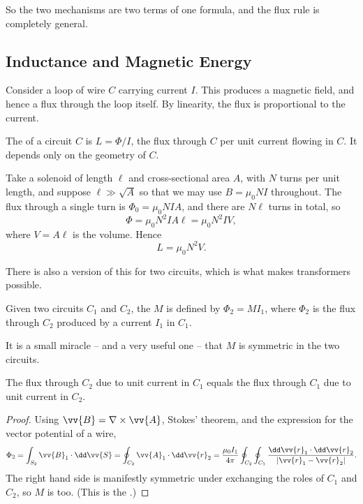 So the two mechanisms are two terms of one formula, and the flux rule is completely general.

\subsection{Inductance and Magnetic Energy}

Consider a loop of wire $C$ carrying current $I$. This produces a magnetic field, and hence a flux through the loop itself. By linearity, the flux is proportional to the current.

\begin{definition}[Inductance]
	The  of a circuit $C$ is $L = \Phi/I$, the flux through $C$ per unit current flowing in $C$. It depends only on the geometry of $C$.
\end{definition}

\begin{example}
	Take a solenoid of length $\ell$ and cross-sectional area $A$, with $N$ turns per unit length, and suppose $\ell \gg \sqrt{A}$ so that we may use $B = \mu_0 N I$ throughout. The flux through a single turn is $\Phi_0 = \mu_0 N I A$, and there are $N\ell$ turns in total, so
	$$
	\Phi = \mu_0 N^2 I A \ell = \mu_0 N^2 I V,
	$$
	where $V = A\ell$ is the volume. Hence
	$$
	L = \mu_0 N^2 V.
	$$
\end{example}

There is also a version of this for two circuits, which is what makes transformers possible.

\begin{definition}
	Given two circuits $C_1$ and $C_2$, the  $M$ is defined by $\Phi_2 = M I_1$, where $\Phi_2$ is the flux through $C_2$ produced by a current $I_1$ in $C_1$.
\end{definition}

It is a small miracle -- and a very useful one -- that $M$ is symmetric in the two circuits.

\begin{proposition}
	The flux through $C_2$ due to unit current in $C_1$ equals the flux through $C_1$ due to unit current in $C_2$.
\end{proposition}
\begin{proof}
	Using $\vv{B} = \nabla\times\vv{A}$, Stokes' theorem, and the expression for the vector potential of a wire,
	$$
	\Phi_2 = \int_{S_2}\vv{B}_1\cdot\dd\vv{S} = \oint_{C_2}\vv{A}_1\cdot \dd\vv{r}_2 = \frac{\mu_0 I_1}{4\pi}\oint_{C_2}\oint_{C_1}\frac{\dd \vv{r}_1\cdot \dd\vv{r}_2}{|\vv{r}_1-\vv{r}_2|}.
	$$
	The right hand side is manifestly symmetric under exchanging the roles of $C_1$ and $C_2$, so $M$ is too. (This is the .)
\end{proof}

